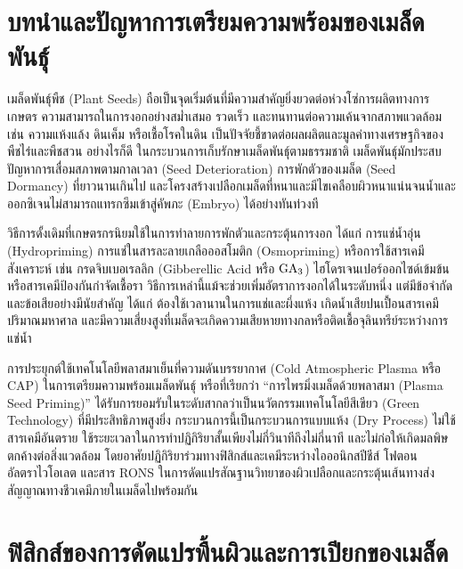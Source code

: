 \clearpage


\section{บทนำและปัญหาการเตรียมความพร้อมของเมล็ดพันธุ์}

เมล็ดพันธุ์พืช (Plant Seeds) ถือเป็นจุดเริ่มต้นที่มีความสำคัญยิ่งยวดต่อห่วงโซ่การผลิตทางการเกษตร ความสามารถในการงอกอย่างสม่ำเสมอ รวดเร็ว และทนทานต่อความเค้นจากสภาพแวดล้อม เช่น ความแห้งแล้ง ดินเค็ม หรือเชื้อโรคในดิน เป็นปัจจัยชี้ขาดต่อผลผลิตและมูลค่าทางเศรษฐกิจของพืชไร่และพืชสวน อย่างไรก็ดี ในกระบวนการเก็บรักษาเมล็ดพันธุ์ตามธรรมชาติ เมล็ดพันธุ์มักประสบปัญหาการเสื่อมสภาพตามกาลเวลา (Seed Deterioration) การพักตัวของเมล็ด (Seed Dormancy) ที่ยาวนานเกินไป และโครงสร้างเปลือกเมล็ดที่หนาและมีไขเคลือบผิวหนาแน่นจนน้ำและออกซิเจนไม่สามารถแทรกซึมเข้าสู่คัพภะ (Embryo) ได้อย่างทันท่วงที

วิธีการดั้งเดิมที่เกษตรกรนิยมใช้ในการทำลายการพักตัวและกระตุ้นการงอก ได้แก่ การแช่น้ำอุ่น (Hydropriming) การแช่ในสารละลายเกลือออสโมติก (Osmopriming) หรือการใช้สารเคมีสังเคราะห์ เช่น กรดจิบเบอเรลลิก (Gibberellic Acid หรือ $\ce{GA3}$) ไฮโดรเจนเปอร์ออกไซด์เข้มข้น หรือสารเคมีป้องกันกำจัดเชื้อรา วิธีการเหล่านี้แม้จะช่วยเพิ่มอัตราการงอกได้ในระดับหนึ่ง แต่มีข้อจำกัดและข้อเสียอย่างมีนัยสำคัญ ได้แก่ ต้องใช้เวลานานในการแช่และผึ่งแห้ง เกิดน้ำเสียปนเปื้อนสารเคมีปริมาณมหาศาล และมีความเสี่ยงสูงที่เมล็ดจะเกิดความเสียหายทางกลหรือติดเชื้อจุลินทรีย์ระหว่างการแช่น้ำ

การประยุกต์ใช้เทคโนโลยีพลาสมาเย็นที่ความดันบรรยากาศ (Cold Atmospheric Plasma หรือ CAP) ในการเตรียมความพร้อมเมล็ดพันธุ์ หรือที่เรียกว่า ``การไพรมิ่งเมล็ดด้วยพลาสมา (Plasma Seed Priming)'' ได้รับการยอมรับในระดับสากลว่าเป็นนวัตกรรมเทคโนโลยีสีเขียว (Green Technology) ที่มีประสิทธิภาพสูงยิ่ง กระบวนการนี้เป็นกระบวนการแบบแห้ง (Dry Process) ไม่ใช้สารเคมีอันตราย ใช้ระยะเวลาในการทำปฏิกิริยาสั้นเพียงไม่กี่วินาทีถึงไม่กี่นาที และไม่ก่อให้เกิดมลพิษตกค้างต่อสิ่งแวดล้อม โดยอาศัยปฏิกิริยาร่วมทางฟิสิกส์และเคมีระหว่างไอออนิกสปีชีส์ โฟตอนอัลตราไวโอเลต และสาร RONS ในการดัดแปรสัณฐานวิทยาของผิวเปลือกและกระตุ้นเส้นทางส่งสัญญาณทางชีวเคมีภายในเมล็ดไปพร้อมกัน

\section{ฟิสิกส์ของการดัดแปรพื้นผิวและการเปียกของเมล็ด}

